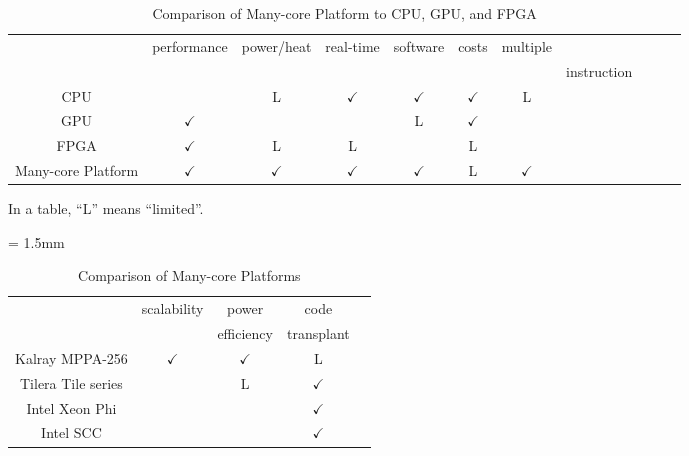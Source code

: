   \begin{table}[t]
    \caption{\label{tb:comparison_platforms}
      Comparison of Many-core Platform to CPU, GPU, and FPGA}
    \centering
    \begin{tabular}{c|cccccccccc}
      \hline
      & \multirow{2}{*}{performance} & \multirow{2}{*}{power/heat} & \multirow{2}{*}{real-time} & software & \multirow{2}{*}{costs} & multiple\\
      &&&&& development && instruction \\
      \hline
      \hline
      CPU & & L & \(\checkmark\) & \(\checkmark\) & \(\checkmark\) & L \\
      GPU & \(\checkmark\) &  &  & L & \(\checkmark\)\\
      FPGA & \(\checkmark\) & L & L &  & L & \\
      Many-core Platform & \(\checkmark\) & \(\checkmark\) & \(\checkmark\) & \(\checkmark\) & L & \(\checkmark\) \\
      \hline
    \end{tabular}
    \begin{flushright}
        \textasteriskcentered In a table, ``L'' means ``limited''.
    \end{flushright}
  \end{table}
  
  \begin{table}[t]
    \caption{\label{tb:comparison_manycore}
      Comparison of Many-core Platforms}
    \centering
    \scriptsize	                    %
    \tabcolsep = 1.5mm              %
    \begin{tabular}{c|cccc}
      \hline
      & \multirow{2}{*}{scalability} & power  & code & \\
      & & efficiency & transplant & \\
      \hline
      \hline
      Kalray MPPA-256 \cite{de2014time} & \(\checkmark\) & \(\checkmark\) & L & \\
      Tilera Tile series \cite{bell2008tile64} &  & L & \(\checkmark\) & \\
      Intel Xeon Phi \cite{chrysos2014intel} \cite{chrysos2012intel} &  &  & \(\checkmark\) & \\
      Intel SCC \cite{baron2010single} &  &  & \(\checkmark\) & \\
      \hline
    \end{tabular}
  \end{table}
  
